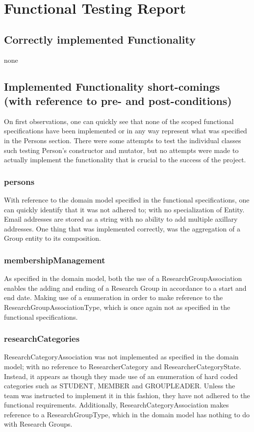 \documentclass{article}
\begin{document}
\section{Functional Testing Report}

	\subsection{Correctly implemented Functionality}
	
	none

    \subsection{Implemented Functionality short-comings (with reference to pre- and post-conditions)}
    
    	On first observations, one can quickly see that none of the scoped functional specifications have been implemented or in any way represent what was specified in the Persons section. There were some attempts to test the individual classes such testing Person's constructor and mutator, but no attempts were made to actually implement the functionality that is crucial to the success of the project.
	
		\subsubsection{persons}
		With reference to the domain model specified in the functional specifications, one can quickly identify that it was not adhered to; with no specialization of Entity. Email addresses are stored as a string with no ability to add multiple axillary addresses. One thing that was implemented correctly, was the aggregation of a Group entity to its composition.

		\subsubsection{membershipManagement}
		As specified in the domain model, both the use of a ResearchGroupAssociation enables the adding and ending of a Research Group in accordance to a start and end date. Making use of a enumeration in order to make reference to the ResearchGroupAssociationType, which is once again not as specified in the functional specifications. 

		\subsubsection{researchCategories}
		ResearchCategoryAssociation was not implemented as specified in the domain model; with no reference to ResearcherCategory and ResearcherCategoryState. Instead, it appears as though they made use of an enumeration of hard coded categories such as STUDENT, MEMBER and GROUPLEADER. Unless the team was instructed to implement it in this fashion, they have not adhered to the functional requirements. Additionally, ResearchCategoryAssociation makes reference to a ResearchGroupType, which in the domain model has nothing to do with Research Groups.
\end{document}
